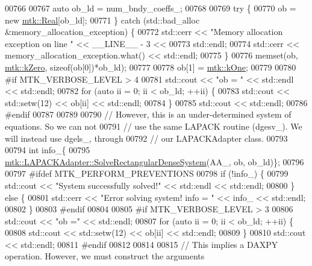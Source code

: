 \begin{DoxyCode}
{{00766 
00767     \textcolor{keyword}{auto} ob\_ld = num\_bndy\_coeffs\_;
00768 
00769     \textcolor{keywordflow}{try} \{
00770       ob = \textcolor{keyword}{new} \hyperlink{group__c01-roots_gac080bbbf5cbb5502c9f00405f894857d}{mtk::Real}[ob\_ld];
00771     \} \textcolor{keywordflow}{catch} (std::bad\_alloc &memory\_allocation\_exception) \{
00772       std::cerr << \textcolor{stringliteral}{"Memory allocation exception on line "} << \_\_LINE\_\_ - 3 <<
00773         std::endl;
00774       std::cerr << memory\_allocation\_exception.what() << std::endl;
00775     \}
00776     memset(ob, \hyperlink{group__c01-roots_ga59a451a5fae30d59649bcda274fea271}{mtk::kZero}, \textcolor{keyword}{sizeof}(ob[0])*ob\_ld);
00777 
00778     ob[1] = \hyperlink{group__c01-roots_ga26407c24d43b6b95480943340d285c71}{mtk::kOne};
00779 
00780 \textcolor{preprocessor}{    #if MTK\_VERBOSE\_LEVEL > 4}
00781     std::cout << \textcolor{stringliteral}{"ob = "} << std::endl << std::endl;
00782     \textcolor{keywordflow}{for} (\textcolor{keyword}{auto} ii = 0; ii < ob\_ld; ++ii) \{
00783       std::cout << std::setw(12) << ob[ii] << std::endl;
00784     \}
00785     std::cout << std::endl;
00786 \textcolor{preprocessor}{    #endif}
00787 
00789 
00790     \textcolor{comment}{// However, this is an under-determined system of equations. So we can not}
00791     \textcolor{comment}{// use the same LAPACK routine (dgesv\_). We will instead use dgels\_, through}
00792     \textcolor{comment}{// our LAPACKAdapter class.}
00793 
00794     \textcolor{keywordtype}{int} info\_\{
00795       \hyperlink{classmtk_1_1LAPACKAdapter_a380f148ffdf96bae2f79ae28f1a6560c}{mtk::LAPACKAdapter::SolveRectangularDenseSystem}(AA\_, 
      ob, ob\_ld)\};
00796 
00797 \textcolor{preprocessor}{    #ifdef MTK\_PERFORM\_PREVENTIONS}
00798     \textcolor{keywordflow}{if} (!info\_) \{
00799       std::cout << \textcolor{stringliteral}{"System successfully solved!"} << std::endl << std::endl;
00800     \} \textcolor{keywordflow}{else} \{
00801       std::cerr << \textcolor{stringliteral}{"Error solving system! info = "} << info\_ << std::endl;
00802     \}
00803 \textcolor{preprocessor}{    #endif}
00804 
00805 \textcolor{preprocessor}{    #if MTK\_VERBOSE\_LEVEL > 3}
00806     std::cout << \textcolor{stringliteral}{"ob ="} << std::endl;
00807     \textcolor{keywordflow}{for} (\textcolor{keyword}{auto} ii = 0; ii < ob\_ld; ++ii) \{
00808       std::cout << std::setw(12) << ob[ii] << std::endl;
00809     \}
00810     std::cout << std::endl;
00811 \textcolor{preprocessor}{    #endif}
00812 
00814 
00815     \textcolor{comment}{// This implies a DAXPY operation. However, we must construct the arguments}
}}
\end{DoxyCode}
